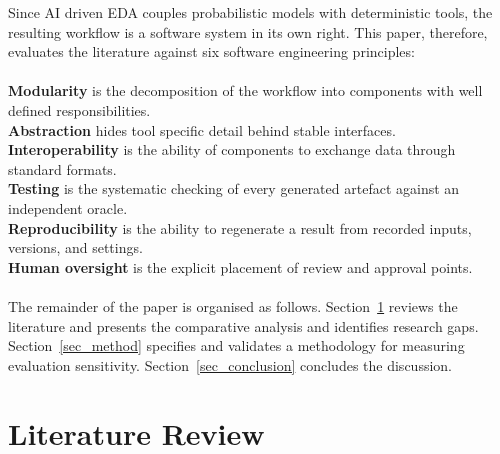 \documentclass[conference]{IEEEtran}
\begin{document}
\noindent Since AI driven EDA couples probabilistic models with deterministic tools, the resulting workflow is a software system in its own right. This paper, therefore, evaluates the literature against six software engineering principles: \\\\
\textbf{Modularity} is the decomposition of the workflow into components with well defined responsibilities. \\ \textbf{Abstraction} hides tool specific detail behind stable interfaces. \\
\textbf{Interoperability} is the ability of components to exchange data through standard formats.\\
\textbf{Testing} is the systematic checking of every generated artefact against an independent oracle. 
\\
\textbf{Reproducibility} is the ability to regenerate a result from recorded inputs, versions, and settings. \\
\textbf{Human oversight} is the explicit placement of review and approval points. \\\\
 The remainder of the paper is organised as follows. Section~\ref{sec_litrev} reviews the literature and presents the comparative analysis and identifies research gaps. Section~\ref{sec_method} specifies and validates a methodology for measuring evaluation sensitivity. Section~\ref{sec_conclusion} concludes the discussion.

\section{Literature Review}\label{sec_litrev}
\end{document}
